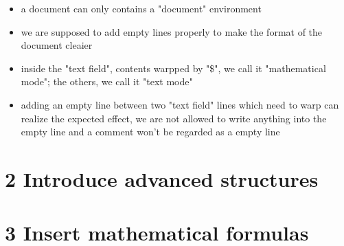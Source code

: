 \begin{itemize}
    \item a document can only contains a "document" environment
    \item we are supposed to add empty lines properly to make the format of the document cleaier
    \item inside the "text field", contents warpped by "\$", we call it "mathematical mode"; the others, we call it "text mode"
    \item adding an empty line between two "text field" lines which need to warp can realize the expected effect, we are not allowed to write anything into the empty line and a comment won't be regarded as a empty line
\end{itemize}

\section*{2 Introduce advanced structures}

\section*{3 Insert mathematical formulas}

